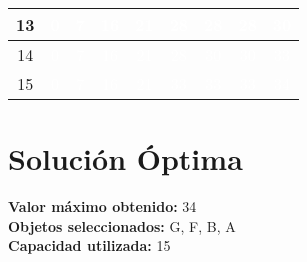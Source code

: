 \documentclass{article}
\begin{document}
\begin{center}
\begin{tabular}{|c|c|c|c|c|c|c|c|c|}
13 & \cellcolor{rojo}\textcolor{white}{0} & \cellcolor{verde}\textcolor{white}{7} & \cellcolor{verde}\textcolor{white}{16} & \cellcolor{verde}\textcolor{white}{21} & \cellcolor{verde}\textcolor{white}{28} & \cellcolor{rojo}\textcolor{white}{28} & \cellcolor{rojo}\textcolor{white}{28} & \cellcolor{verde}\textcolor{white}{30} \\ \hline
14 & \cellcolor{rojo}\textcolor{white}{0} & \cellcolor{verde}\textcolor{white}{7} & \cellcolor{verde}\textcolor{white}{16} & \cellcolor{verde}\textcolor{white}{21} & \cellcolor{verde}\textcolor{white}{28} & \cellcolor{verde}\textcolor{white}{30} & \cellcolor{rojo}\textcolor{white}{30} & \cellcolor{verde}\textcolor{white}{33} \\ \hline
15 & \cellcolor{rojo}\textcolor{white}{0} & \cellcolor{verde}\textcolor{white}{7} & \cellcolor{verde}\textcolor{white}{16} & \cellcolor{verde}\textcolor{white}{21} & \cellcolor{verde}\textcolor{white}{33} & \cellcolor{rojo}\textcolor{white}{33} & \cellcolor{rojo}\textcolor{white}{33} & \cellcolor{verde}\textcolor{white}{34} \\ \hline
\end{tabular}
\end{center}
\normalsize

\section*{Solución Óptima}
\textbf{Valor máximo obtenido:} 34\\
\textbf{Objetos seleccionados:} G, F, B, A\\
\textbf{Capacidad utilizada:} 15\\
\end{document}

